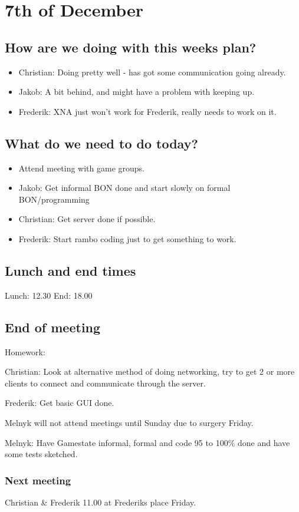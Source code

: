 \section{7th of December}
\subsection{How are we doing with this weeks plan?}
\begin{itemize}
\item Christian: Doing pretty well - has got some communication going already.
\item Jakob: A bit behind, and might have a problem with keeping up.
\item Frederik: XNA just won't work for Frederik, really needs to work on it.
\end{itemize}

\subsection{What do we need to do today?}
\begin{itemize}
\item Attend meeting with game groups.
\item Jakob: Get informal BON done and start slowly on formal BON/programming
\item Christian: Get server done if possible.
\item Frederik: Start rambo coding just to get something to work.
\end{itemize}

\subsection{Lunch and end times}
Lunch:
12.30
End:
18.00
\subsection{End of meeting}
Homework: 

Christian: Look at alternative method of doing networking, try to get 2 or more clients to connect and communicate through the server.

Frederik: Get basic GUI done.

Melnyk will not attend meetings until Sunday due to surgery Friday.

Melnyk: Have Gamestate informal, formal and code 95 to 100\% done and have some tests sketched.

\subsubsection{Next meeting}
Christian \& Frederik 11.00 at Frederiks place Friday.
